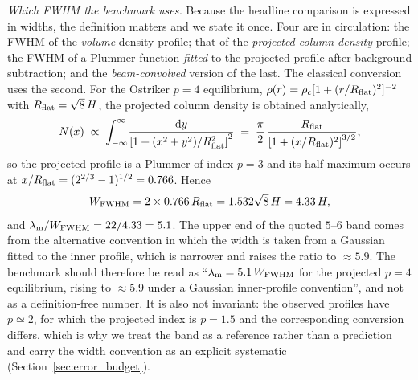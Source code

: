 \documentclass[usenatbib,twoside,twocolumn]{mnras}
\begin{document}
\emph{Which FWHM the benchmark uses.} Because the headline comparison is expressed in widths, the definition matters and we state it once. Four are in circulation: the FWHM of the \emph{volume} density profile; that of the \emph{projected column-density} profile; the FWHM of a Plummer function \emph{fitted} to the projected profile after background subtraction; and the \emph{beam-convolved} version of the last. The classical conversion uses the second. For the Ostriker $p=4$ equilibrium, $\rho(r)=\rho_c[1+(r/R_{\rm flat})^2]^{-2}$ with $R_{\rm flat}=\sqrt8\,H$, the projected column density is obtained analytically,
\begin{equation}
N(x)\;\propto\;\int_{-\infty}^{\infty}\!\frac{{\rm d}y}{\left[1+(x^2+y^2)/R_{\rm flat}^2\right]^{2}}\;=\;\frac{\pi}{2}\,\frac{R_{\rm flat}}{\left[1+(x/R_{\rm flat})^{2}\right]^{3/2}},
\label{eq:ostrikercol}
\end{equation}
so the projected profile is a Plummer of index $p=3$ and its half-maximum occurs at $x/R_{\rm flat}=(2^{2/3}-1)^{1/2}=0.766$. Hence
\begin{equation}
W_{\rm FWHM}=2\times0.766\,R_{\rm flat}=1.532\sqrt8\,H=4.33\,H,
\label{eq:ostrikerfwhm}
\end{equation}
and $\lambda_{\rm m}/W_{\rm FWHM}=22/4.33=5.1$. The upper end of the quoted $5$--$6$ band comes from the alternative convention in which the width is taken from a Gaussian fitted to the inner profile, which is narrower and raises the ratio to $\approx5.9$. The benchmark should therefore be read as ``$\lambda_{\rm m}=5.1\,W_{\rm FWHM}$ for the projected $p=4$ equilibrium, rising to $\approx5.9$ under a Gaussian inner-profile convention'', and not as a definition-free number. It is also not invariant: the observed profiles have $p\simeq2$, for which the projected index is $p=1.5$ and the corresponding conversion differs, which is why we treat the band as a reference rather than a prediction and carry the width convention as an explicit systematic (Section~\ref{sec:error_budget}).
\end{document}
